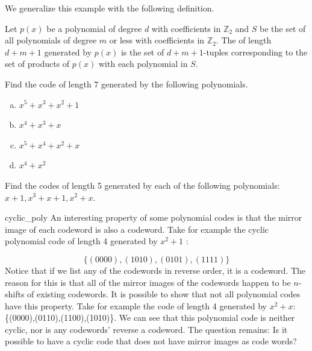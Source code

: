 We generalize this example with the following definition.

\begin{defn}{}
Let $p(x)$ be a polynomial of degree $d$ with coefficients in $\mathbb{Z}_2$ and $S$ be the set of all polynomials of degree $m$ or less with coefficients in $\mathbb{Z}_2$. The  of length $d+m+1$ generated by $p(x)$ is the set of $d+m+1$-tuples corresponding to the set of products of $p(x)$ with each polynomial in $S$.
\end {defn}

\begin{exercise}{}
Find the code of length 7 generated by the following polynomials.
\begin{enumerate}[(a)]
\item $x^5 + x^3 + x^2 + 1$
\item $x^4 + x^3 + x$
\item $x^5 + x^4 + x^2 + x$
\item $x^4 + x^2$
\end {enumerate}
\end {exercise}

\begin{exercise}{}
Find the codes of length 5 generated by each of the following polynomials: $x + 1, x^3+x+1, x^2 + x$.
\end {exercise}

\begin{example}{cyclic_poly}
An interesting property of some polynomial codes is that the mirror image of each codeword is also a codeword.  Take for example the cyclic polynomial code of length 4 generated by $x^2 + 1$ :

 \[\{(0000),(1010),(0101),(1111)\}\]  Notice that if we list any of the codewords in reverse order, it is a codeword.  The reason for this is that all of the mirror images of the codewords happen to be $n$-shifts of existing codewords.  It is possible to show that not all polynomial codes have this property.  Take for example the code of length 4 generated by $x^2 + x$: \{(0000),(0110),(1100),(1010)\}.  We can see that this polynomial code is neither cyclic, nor is any codewords' reverse a codeword.  The question remains: Is it possible to have a cyclic code that does not have mirror images as code words?
\end {example}

